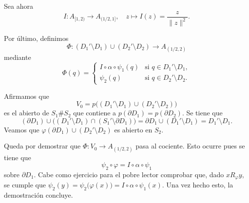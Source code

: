 {    Sea ahora 
    \[
    I : A_{[1, 2)} \to A_{(1/2, 1]},\quad z \mapsto I(z) = \frac{z}{\|z\|^2}.
    \]

    Por último, definimos 
    \[
    \Phi : (D_1' \setminus D_1) \cup (D_2' \setminus D_2) \to A_{(1/2, 2)}
    \]
    mediante
    \[
    \Phi(q) = 
    \begin{cases}
    I \circ \alpha \circ \psi_1(q) & \text{si } q \in D_1' \setminus D_1, \\
    \psi_2(q) & \text{si } q \in D_2' \setminus D_2.
    \end{cases}
    \]

    Afirmamos que 
    \[
    V_0 = p\big((D_1' \setminus D_1) \cup (D_2' \setminus D_2)\big)
    \]
    es el abierto de \(S_1 \# S_2\) que contiene a \(p(\partial D_1) = p(\partial D_2)\). Se tiene que 
    \[
    (\partial D_1)\cup \big((D_1' \setminus D_1) \cap (S_1' \setminus \partial D_1)\big) = \partial D_1 \cup (D_1' \setminus D_1) = D_1'\setminus D_1.
    \]
    Veamos que \(\varphi(\partial D_1) \cup (D_2'\setminus D_2) \) es abierto en \(S_2\).

    Queda por demostrar que 
    \(\Phi : V_0 \to A_{(1/2, 2)}\) pasa al cociente. Esto ocurre pues se tiene que 
    \[
    \psi_2 \circ \varphi = I \circ \alpha \circ \psi_1
    \]
    sobre \(\partial D_1\). Cabe como ejercicio para el pobre lector comprobar que, dado \(x R_\varphi y\), se cumple que \(\psi_2(y) = \psi_2\big(\varphi(x)\big) = I \circ \alpha \circ \psi_1(x)\). Una vez hecho esto, la demostración concluye.  
}